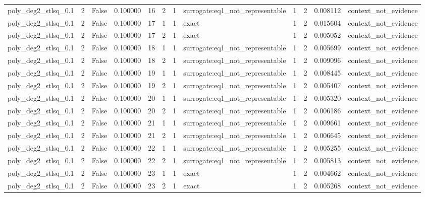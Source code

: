 \begin{tabular}{lrrrrrrlrrrl}
poly\_deg2\_stlsq\_0.1 & 2 & False & 0.100000 & 16 & 2 & 1 & surrogate:eq1\_not\_representable & 1 & 2 & 0.008112 & context\_not\_evidence \\
poly\_deg2\_stlsq\_0.1 & 2 & False & 0.100000 & 17 & 1 & 1 & exact & 1 & 2 & 0.015604 & context\_not\_evidence \\
poly\_deg2\_stlsq\_0.1 & 2 & False & 0.100000 & 17 & 2 & 1 & exact & 1 & 2 & 0.005052 & context\_not\_evidence \\
poly\_deg2\_stlsq\_0.1 & 2 & False & 0.100000 & 18 & 1 & 1 & surrogate:eq1\_not\_representable & 1 & 2 & 0.005699 & context\_not\_evidence \\
poly\_deg2\_stlsq\_0.1 & 2 & False & 0.100000 & 18 & 2 & 1 & surrogate:eq1\_not\_representable & 1 & 2 & 0.009096 & context\_not\_evidence \\
poly\_deg2\_stlsq\_0.1 & 2 & False & 0.100000 & 19 & 1 & 1 & surrogate:eq1\_not\_representable & 1 & 2 & 0.008445 & context\_not\_evidence \\
poly\_deg2\_stlsq\_0.1 & 2 & False & 0.100000 & 19 & 2 & 1 & surrogate:eq1\_not\_representable & 1 & 2 & 0.005407 & context\_not\_evidence \\
poly\_deg2\_stlsq\_0.1 & 2 & False & 0.100000 & 20 & 1 & 1 & surrogate:eq1\_not\_representable & 1 & 2 & 0.005320 & context\_not\_evidence \\
poly\_deg2\_stlsq\_0.1 & 2 & False & 0.100000 & 20 & 2 & 1 & surrogate:eq1\_not\_representable & 1 & 2 & 0.006186 & context\_not\_evidence \\
poly\_deg2\_stlsq\_0.1 & 2 & False & 0.100000 & 21 & 1 & 1 & surrogate:eq1\_not\_representable & 1 & 2 & 0.009661 & context\_not\_evidence \\
poly\_deg2\_stlsq\_0.1 & 2 & False & 0.100000 & 21 & 2 & 1 & surrogate:eq1\_not\_representable & 1 & 2 & 0.006645 & context\_not\_evidence \\
poly\_deg2\_stlsq\_0.1 & 2 & False & 0.100000 & 22 & 1 & 1 & surrogate:eq1\_not\_representable & 1 & 2 & 0.005255 & context\_not\_evidence \\
poly\_deg2\_stlsq\_0.1 & 2 & False & 0.100000 & 22 & 2 & 1 & surrogate:eq1\_not\_representable & 1 & 2 & 0.005813 & context\_not\_evidence \\
poly\_deg2\_stlsq\_0.1 & 2 & False & 0.100000 & 23 & 1 & 1 & exact & 1 & 2 & 0.004662 & context\_not\_evidence \\
poly\_deg2\_stlsq\_0.1 & 2 & False & 0.100000 & 23 & 2 & 1 & exact & 1 & 2 & 0.005268 & context\_not\_evidence \\

\end{tabular}
